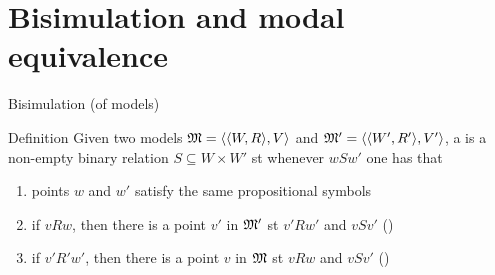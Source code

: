 \documentclass{beamer}
\begin{document}
\section{Bisimulation and modal equivalence}
\begin{slide}{Bisimulation (of models)}\label{s:29}
\small
\begin{block}{Definition}
Given two models $\mathfrak{M} = \mathopen{\langle}\mathopen{\langle}W, R\mathclose{\rangle}, V\mathclose{\rangle}$ and $\mathfrak{M}' = \mathopen{\langle}\mathopen{\langle}W', R'\mathclose{\rangle}, V'\mathclose{\rangle}$, a  is a non-empty binary relation
$S \subseteq W \times W'$  st whenever $w S w'$ one has that
\begin{enumerate}
\item points $w$ and $w'$ satisfy the same propositional symbols
\item if $v R w$, then there is a point $v'$ in $\mathfrak{M}'$ st  $v' R w'$ and $v S v'$ \hspace{0.3cm} ()
\item if $v' R' w'$, then there is a point $v$ in $\mathfrak{M}$ st  $v R w$ and $v S v'$ \hspace{0.3cm} ()
\end{enumerate}
\end{block}
\end{slide}

\end{document}
